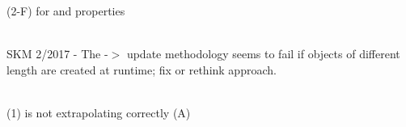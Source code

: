 \begin{DoxyRefList}
\label{todo__todo000261}%
%
(2-\/F)  for  and  properties 
\item[Class \doxylink{classcsmp_1_1_index_tracker}{csmp\+::Index\+Tracker} ]\hfill \\
\label{todo__todo000011}%
%
SKM 2/2017 -\/ The  -\/\texorpdfstring{$>$}{>} update methodology seems to fail if  objects of different length are created at runtime; fix or rethink approach. 
\item[Class \doxylink{classcsmp_1_1_integration_point_to_node_property_visitor}{csmp\+::Integration\+Point\+To\+Node\+Property\+Visitor\texorpdfstring{$<$}{<} Var, dim \texorpdfstring{$>$}{>}} ]\hfill \\
\label{todo__todo000150}%
%
(1)  is not extrapolating correctly (A) 




\end{DoxyRefList}
